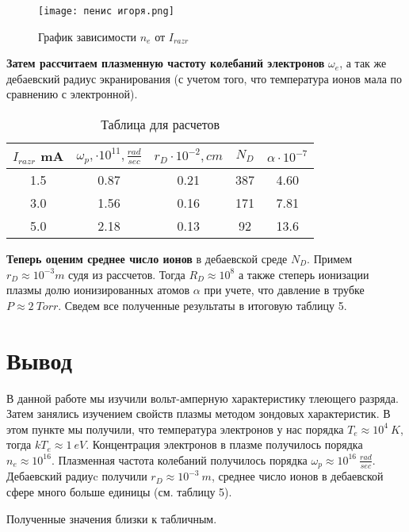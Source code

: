 \documentclass[a4paper,12pt]{article}
\begin{document}
  \begin{figure}[h!]
      \centering
      \texttt{[image: пенис игоря.png]}
      \caption{График зависимости $ n_{e}$ от $I_{razr}$}
      \label{C}
  \end{figure}
  
  
  \textbf{Затем рассчитаем плазменную частоту колебаний электронов} $\omega_e$, а так же дебаевский радиус экранирования (с учетом того, что температура ионов мала по сравнению с электронной). 
  \begin{table}[!]
    \caption{Таблица для расчетов}
    \begin{center}
        \begin{tabular}{|c|c|c|c|c|}
            \hline
        $I_{razr}$ mA & $\omega_p, \cdot 10^{11}, \frac{rad}{sec}$ & $r_D \cdot 10^{-2}, cm$ & $N_D $ & $\alpha \cdot 10^{-7}$ \\
            \hline
        1.5 & 0.87 & 0.21 &  387 &  4.60  \\
            \hline
      3.0 & 1.56 & 0.16  & 171 &  7.81  \\
            \hline
        5.0 & 2.18 & 0.13  & 92 & 13.6  \\
            \hline
        \end{tabular}
    \end{center}
  \label{B_table}
  \end{table}
  \textbf{Теперь оценим среднее число ионов} в дебаевской среде $N_D$. 
  Примем $r_D \approx 10^{-3} m$ судя из рассчетов. Тогда $R_D \approx 10^{8}$
  а также степерь ионизации плазмы долю ионизированных атомов $\alpha$ при учете, что давление в трубке $P \approx  2 \: Torr$.
  Сведем все полученные результаты в итоговую таблицу 5.
  
  
  \section{Вывод}
  
  В данной работе мы изучили вольт-амперную характеристику тлеющего разряда.
  Затем занялись изучением свойств плазмы методом зондовых характеристик.
  \newline
  В этом пункте мы получили, что температура электронов у нас порядка $T_e \approx 10^{4} \: K$, тогда $kT_e \approx 1 \: eV$. 
  \newline
  Концентрация электронов в плазме получилось порядка $n_e \approx 10^{16}$. 
  \newline
  Плазменная частота колебаний получилось порядка $\omega_p \approx 10^{16} \: \frac{rad}{sec}$.
  \newline
  Дебаевский радиуc получили $r_D \approx 10^{-3} \: m$, среднее число ионов в дебаевской сфере много больше единицы (см. таблицу 5). 
  
  Полученные значения близки к табличным. 
 
 
 
\end{document}
